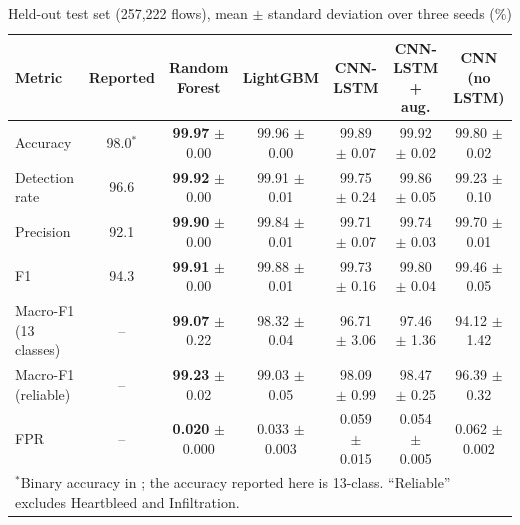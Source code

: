 \documentclass[conference]{IEEEtran}
\begin{document}
\begin{table}[t]
\caption{Held-out test set (257,222 flows), mean $\pm$ standard deviation over three seeds (\%)}
\label{tab:main}
\centering
\footnotesize
\begin{tabular}{lcccccc}
\toprule
Metric & Reported \cite{refpaper2025} & Random Forest & LightGBM & CNN-LSTM & CNN-LSTM + aug. & CNN (no LSTM) \\
\midrule
Accuracy & 98.0$^\ast$ & \textbf{99.97} $\pm$ 0.00 & 99.96 $\pm$ 0.00 & 99.89 $\pm$ 0.07 & 99.92 $\pm$ 0.02 & 99.80 $\pm$ 0.02 \\
Detection rate & 96.6 & \textbf{99.92} $\pm$ 0.00 & 99.91 $\pm$ 0.01 & 99.75 $\pm$ 0.24 & 99.86 $\pm$ 0.05 & 99.23 $\pm$ 0.10 \\
Precision & 92.1 & \textbf{99.90} $\pm$ 0.00 & 99.84 $\pm$ 0.01 & 99.71 $\pm$ 0.07 & 99.74 $\pm$ 0.03 & 99.70 $\pm$ 0.01 \\
F1 & 94.3 & \textbf{99.91} $\pm$ 0.00 & 99.88 $\pm$ 0.01 & 99.73 $\pm$ 0.16 & 99.80 $\pm$ 0.04 & 99.46 $\pm$ 0.05 \\
Macro-F1 (13 classes) & -- & \textbf{99.07} $\pm$ 0.22 & 98.32 $\pm$ 0.04 & 96.71 $\pm$ 3.06 & 97.46 $\pm$ 1.36 & 94.12 $\pm$ 1.42 \\
Macro-F1 (reliable) & -- & \textbf{99.23} $\pm$ 0.02 & 99.03 $\pm$ 0.05 & 98.09 $\pm$ 0.99 & 98.47 $\pm$ 0.25 & 96.39 $\pm$ 0.32 \\
FPR & -- & \textbf{0.020} $\pm$ 0.000 & 0.033 $\pm$ 0.003 & 0.059 $\pm$ 0.015 & 0.054 $\pm$ 0.005 & 0.062 $\pm$ 0.002 \\
\bottomrule
\multicolumn{7}{l}{$^\ast$Binary accuracy in \cite{refpaper2025}; the accuracy reported here is 13-class. ``Reliable'' excludes Heartbleed and Infiltration.}
\end{tabular}
\end{table}
\end{document}
